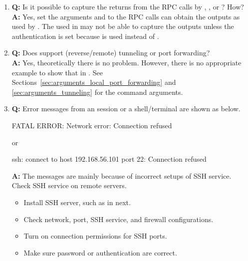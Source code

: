 \begin{enumerate}
\item {\bf\color{blue} Q:}
      Is it possible to capture the returns from the RPC calls
      by , , or ? How? \\
      {\bf\color{blue} A:}
      Yes, set the arguments  and 
      to the RPC calls can obtain the outputs as used by .
      The  used in  may not be able to capture
      the outputs unless the authentication is set because 
      is used instead of .

\item {\bf\color{blue} Q:}
      Does  support  (reverse/remote) tunneling or
      port forwarding? \\
      {\bf\color{blue} A:}
      Yes, theoretically there is no problem. However, there is no
      appropriate example to show that in .
      See Sections~\ref{sec:arguments_local_port_forwarding}
      and \ref{sec:arguments_tunneling} for the command arguments.

\item {\bf\color{blue} Q:}
      Error messages from an  session or a shell/terminal
      are shown as below.
\begin{Error}
FATAL ERROR: Network error: Connection refused
\end{Error}
      or
\begin{Error}
ssh: connect to host 192.168.56.101 port 22: Connection refused
\end{Error}
      {\bf\color{blue} A:}
      The messages are mainly because of incorrect setups of SSH service.
      Check SSH service on remote servers.
      \begin{itemize}
      \item Install SSH server, such as in next.
      \item Check network, port, SSH service, and firewall configurations.
      \item Turn on connection permissions for SSH ports.
      \item Make sure password or authentication are correct.
      \end{itemize} 

\end{enumerate}

